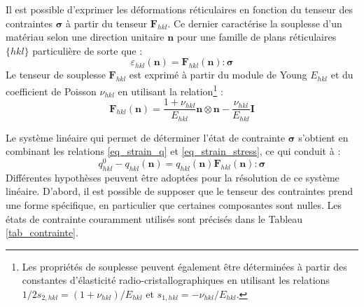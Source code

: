 \documentclass[french,a4paper]{report}
\begin{document}
Il est possible d'exprimer les déformations réticulaires en fonction du tenseur des contraintes $\boldsymbol \sigma$ à partir du tenseur $\boldsymbol F_{hkl}$. Ce dernier caractérise la souplesse d'un matériau selon une direction unitaire $\boldsymbol n$ pour une famille de plans réticulaires $\{hkl\}$ particulière de sorte que :
\begin{equation}
\varepsilon_{hkl} (\boldsymbol n) = \boldsymbol F_{hkl} (\boldsymbol n) : \boldsymbol \sigma
\label{eq_strain_stress}
\end{equation}
Le tenseur de souplesse $\boldsymbol F_{hkl}$ est exprimé à partir du module de Young $E_{hkl}$ et du coefficient de Poisson $\nu_{hkl}$ en utilisant la relation\footnote{Les propriétés de souplesse peuvent également être déterminées à partir des constantes d'élasticité radio-cristallographiques en utilisant les relations $1/2 s_{2,hkl}= (1+\nu_{hkl})/E_{hkl}$ et $ s_{1,hkl}= -\nu_{hkl}/E_{hkl}$.} :
\begin{equation}
\boldsymbol F_{hkl} (\boldsymbol n) = \frac{1+\nu_{hkl}}{E_{hkl}} \boldsymbol n \otimes \boldsymbol n - \frac{\nu_{hkl}}{E_{hkl}} \boldsymbol I 
\end{equation}

Le système linéaire qui permet de déterminer l'état de contrainte $\boldsymbol \sigma$ s'obtient en combinant les relations \eqref{eq_strain_q} et \eqref{eq_strain_stress}, ce qui conduit à :
\begin{equation}
q^0_{hkl}-q_{hkl}(\boldsymbol n) =q_{hkl}(\boldsymbol n) \boldsymbol F_{hkl} (\boldsymbol n) : \boldsymbol \sigma
\end{equation}
Différentes hypothèses peuvent être adoptées pour la résolution de ce système linéaire. D'abord, il est possible de supposer que le tenseur des contraintes prend une forme spécifique, en particulier que certaines composantes sont nulles. Les états de contrainte couramment utilisés sont précisés dans le Tableau \ref{tab_contrainte}. 
\end{document}
